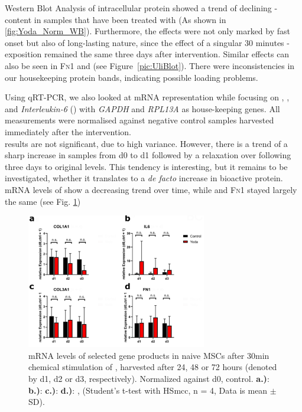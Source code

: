 Western Blot Analysis of intracellular protein showed a trend of declining \colone-content in samples that have been treated with \Yoda{} (As shown in \ref{fig:Yoda_Norm_WB}). Furthermore, the effects were not only marked by fast onset but also of long-lasting nature, since the effect of a singular 30 minutes \Yoda{}-exposition remained the same three days after intervention. Similar effects can also be seen in \textsc{Fn1} and \colthree{} (see Figure~\vref{pic:UliBlot}). There were inconsistencies in our housekeeping protein bands, indicating possible loading problems. \par

Using qRT-PCR, we also looked at mRNA representation while focusing on \coloneGene{}, \colthreeGene{}, \Fn{} and \textit{Interleukin-6} (\ILGene{}) with \textit{GAPDH} and \textit{RPL13A} as house-keeping genes. All measurements were normalised against negative control samples harvested immediately after the intervention. \\
\ILGene results are not significant, due to high variance. However, there is a trend of a sharp increase in \Yoda{} samples from d0 to d1 followed by a relaxation over following three days to original levels. This tendency is interesting, but it remains to be investigated, whether it translates to a \textit{de facto} increase in bioactive \IL protein. mRNA levels of \colone{} show a decreasing trend over time, while \colthree and \textsc{Fn}1 stayed largely the same (see Fig. \ref{fig:Yoda_Norm_PCR})\par



\begin{figure}[ht]
	\centering
	\includegraphics[width = 0.7\textwidth]{NormalYodaExp_PCR.png}
	\caption{mRNA levels of selected gene products in naive MSCs after 30min chemical stimulation of \Piezo{}, harvested after 24, 48 or 72 hours (denoted by d1, d2 or d3, respectively). Normalized against d0, control.
	    \textbf{a.)}: \coloneGene{}
		\textbf{b.)}: \ILGene{}
		\textbf{c.)}: \colthreeGene{}
		\textbf{d.)}: \FnGene, 
		(Student's t-test with HSmcc, n = 4, Data is mean $\pm$ SD). 
	}
	\label{fig:Yoda_Norm_PCR}
\end{figure}


